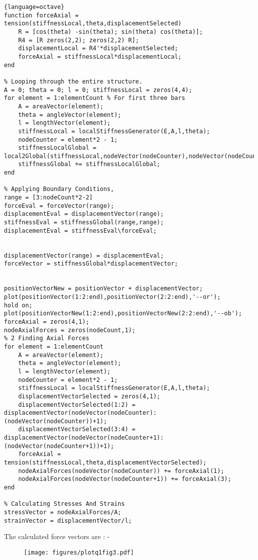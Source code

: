 \documentclass{article}
\begin{document}
\begin{lstlisting}{language=octave}
function forceAxial = tension(stiffnessLocal,theta,displacementSelected)
    R = [cos(theta) -sin(theta); sin(theta) cos(theta)];
    R4 = [R zeros(2,2); zeros(2,2) R];
    displacementLocal = R4'*displacementSelected;
    forceAxial = stiffnessLocal*displacementLocal;
end

% Looping through the entire structure.
A = 0; theta = 0; l = 0; stiffnessLocal = zeros(4,4);
for element = 1:elementCount % For first three bars
    A = areaVector(element);
    theta = angleVector(element);
    l = lengthVector(element);
    stiffnessLocal = localStiffnessGenerator(E,A,l,theta);
    nodeCounter = element*2 - 1;
    stiffnessLocalGlobal = local2Global(stiffnessLocal,nodeVector(nodeCounter),nodeVector(nodeCounter+1),nodeCount);
    stiffnessGlobal += stiffnessLocalGlobal;
end

% Applying Boundary Conditions,
range = [3:nodeCount*2-2]
forceEval = forceVector(range);
displacementEval = displacementVector(range);
stiffnessEval = stiffnessGlobal(range,range);
displacementEval = stiffnessEval\forceEval;


displacementVector(range) = displacementEval;
forceVector = stiffnessGlobal*displacementVector;


positionVectorNew = positionVector + displacementVector;
plot(positionVector(1:2:end),positionVector(2:2:end),'--or');
hold on;
plot(positionVectorNew(1:2:end),positionVectorNew(2:2:end),'--ob');
forceAxial = zeros(4,1);
nodeAxialForces = zeros(nodeCount,1);
% 2 Finding Axial Forces
for element = 1:elementCount
    A = areaVector(element);
    theta = angleVector(element);
    l = lengthVector(element);
    nodeCounter = element*2 - 1;
    stiffnessLocal = localStiffnessGenerator(E,A,l,theta);
    displacementVectorSelected = zeros(4,1);
    displacementVectorSelected(1:2) = displacementVector(nodeVector(nodeCounter):(nodeVector(nodeCounter))+1);
    displacementVectorSelected(3:4) = displacementVector(nodeVector(nodeCounter+1):(nodeVector(nodeCounter+1))+1);
    forceAxial = tension(stiffnessLocal,theta,displacementVectorSelected);
    nodeAxialForces(nodeVector(nodeCounter)) += forceAxial(1);
    nodeAxialForces(nodeVector(nodeCounter+1)) += forceAxial(3);
end

% Calculating Stresses And Strains
stressVector = nodeAxialForces/A;
strainVector = displacementVector/l;

\end{lstlisting}
The calculated force vectors are : - 

\begin{figure}
    \begin{center}
        \texttt{[image: figures/plotq1fig3.pdf]}
    \end{center}
\end{figure}
\end{document}
